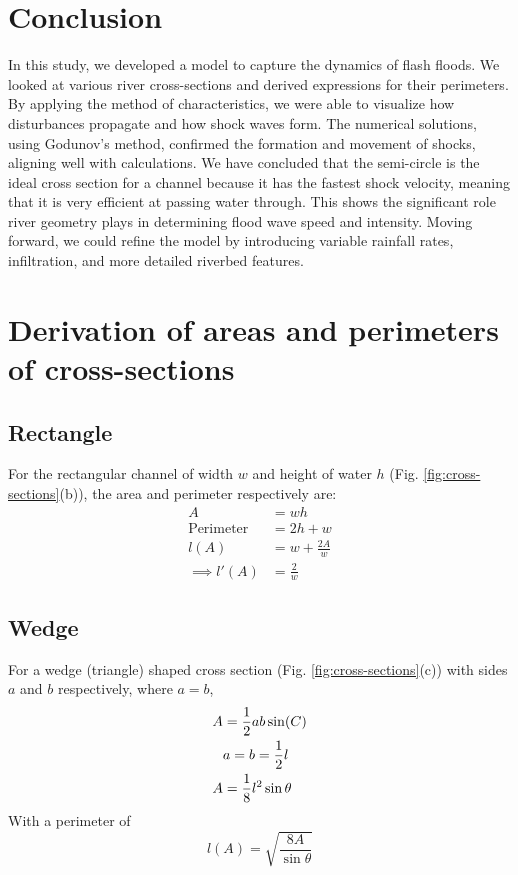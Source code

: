 \documentclass[12pt]{article}
\begin{document}
\section{Conclusion}
In this study, we developed a model to capture the dynamics of flash floods. We looked at various river cross-sections and derived expressions for their perimeters. By applying the method of characteristics, we were able to visualize how disturbances propagate and how shock waves form. The numerical solutions, using Godunov's method, confirmed the formation and movement of shocks, aligning well with calculations. We have concluded that the semi-circle is the ideal cross section for a channel because it has the fastest shock velocity, meaning that it is very efficient at passing water through. This shows the significant role river geometry plays in determining flood wave speed and intensity. Moving forward, we could refine the model by introducing variable rainfall rates, infiltration, and more detailed riverbed features.




\newpage
\appendix
\section{Derivation of areas and perimeters of cross-sections}
\subsection{Rectangle}
\label{appendix:rectangle}
For the rectangular channel of width $w$ and height of water $h$ (Fig. \ref{fig:cross-sections}(b)), the area and perimeter respectively are:
\begin{equation}
    \begin{split}
        A &= wh
        \\\text{Perimeter}&=2h + w
        \\l(A) &= w + \frac{2A}{w}
        \\\implies l'(A) &= \frac{2}{w}
    \end{split}
\end{equation}

\subsection{Wedge}
\label{appendix:wedge}
For a wedge (triangle) shaped cross section (Fig. \ref{fig:cross-sections}(c)) with sides $a$ and $b$ respectively, where $a = b$,
\begin{align}
    A &= \frac{1}{2}ab\sin(C) \notag
    \\&a = b = \frac{1}{2}l \notag
    \\A &= \frac{1}{8}l^2\sin{\theta}
\end{align}
With a perimeter of 
\begin{equation}
    l(A) = \sqrt{\frac{8A}{\sin{\theta}}}
\end{equation}
\end{document}
